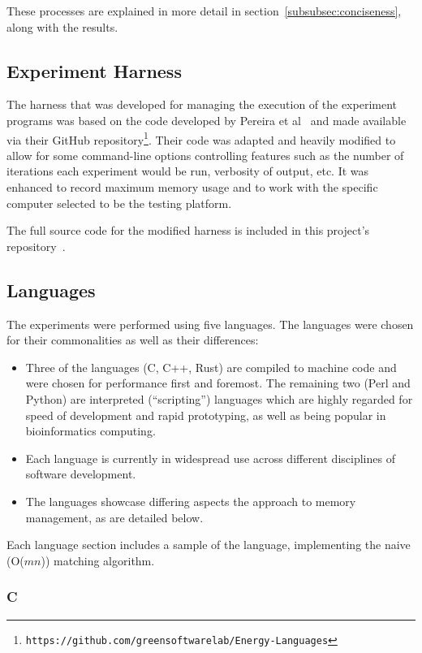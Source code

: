 These processes are explained in more detail in section~\ref{subsubsec:conciseness}, along with the results.

\subsection{Experiment Harness}
\label{subsec:harness}

The harness that was developed for managing the execution of the experiment programs was based on the code developed by Pereira et al~\cite{pereira} and made available via their GitHub repository\footnote{\texttt{https://github.com/greensoftwarelab/Energy-Languages}}. Their code was adapted and heavily modified to allow for some command-line options controlling features such as the number of iterations each experiment would be run, verbosity of output, etc. It was enhanced to record maximum memory usage and to work with the specific computer selected to be the testing platform.

The full source code for the modified harness is included in this project's repository~\cite{github}.

\subsection{Languages}
\label{subsec:languages}

The experiments were performed using five languages. The languages were chosen for their commonalities as well as their differences:

\begin{itemize}
\item Three of the languages (C, C++, Rust) are compiled to machine code and were chosen for performance first and foremost. The remaining two (Perl and Python) are interpreted (``scripting'') languages which are highly regarded for speed of development and rapid prototyping, as well as being popular in bioinformatics computing.
\item Each language is currently in widespread use across different disciplines of software development.
\item The languages showcase differing aspects the approach to memory management, as are detailed below.
\end{itemize}

Each language section includes a sample of the language, implementing the naive (O($mn$)) matching algorithm.

\subsubsection{C}

